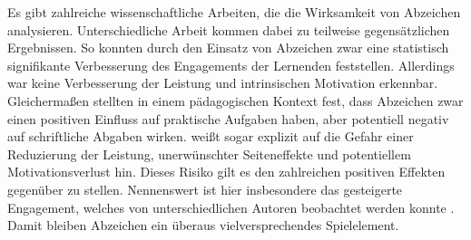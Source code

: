 Es gibt zahlreiche wissenschaftliche Arbeiten, die die Wirksamkeit von Abzeichen analysieren. Unterschiedliche Arbeit kommen dabei zu teilweise gegensätzlichen Ergebnissen. So konnten  durch den Einsatz von Abzeichen zwar eine statistisch signifikante Verbesserung des Engagements der Lernenden feststellen. Allerdings war keine Verbesserung der Leistung und intrinsischen Motivation erkennbar. Gleichermaßen stellten  in einem pädagogischen Kontext fest, dass Abzeichen zwar einen positiven Einfluss auf praktische Aufgaben haben, aber potentiell negativ auf schriftliche Abgaben wirken.  weißt sogar explizit auf die Gefahr einer Reduzierung der Leistung, unerwünschter Seiteneffekte und potentiellem Motivationsverlust hin. Dieses Risiko gilt es den zahlreichen positiven Effekten gegenüber zu stellen. Nennenswert ist hier insbesondere das gesteigerte Engagement, welches von unterschiedlichen Autoren beobachtet werden konnte \cite{ortiz_gamification_2017, dominguez_gamifying_2013, hamari_badges_2017, hamzah_influence_2015}. Damit bleiben Abzeichen ein überaus vielversprechendes Spielelement. 


